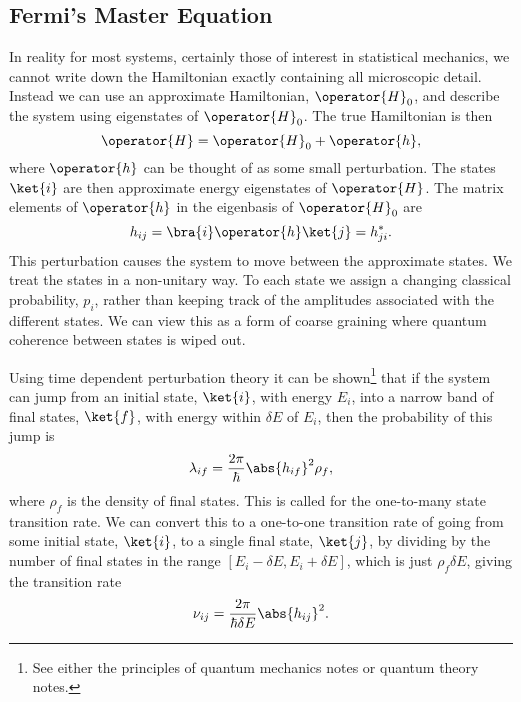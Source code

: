 \documentclass[fleqn]{NotesClass}
\begin{document}
    \subsection{Fermi's Master Equation}
    In reality for most systems, certainly those of interest in statistical mechanics, we cannot write down the Hamiltonian exactly containing all microscopic detail.
    Instead we can use an approximate Hamiltonian, \(\operator{H}_0\), and describe the system using eigenstates of \(\operator{H}_0\).
    The true Hamiltonian is then
    \begin{equation}
        \operator{H} = \operator{H}_0 + \operator{h},
    \end{equation}
    where \(\operator{h}\) can be thought of as some small perturbation.
    The states \(\ket{i}\) are then approximate energy eigenstates of \(\operator{H}\).
    The matrix elements of \(\operator{h}\) in the eigenbasis of \(\operator{H}_0\) are
    \begin{equation}
        h_{ij} = \bra{i}\operator{h}\ket{j} = h_{ji}^*.
    \end{equation}
    This perturbation causes the system to move between the approximate states.
    We treat the states in a non-unitary way.
    To each state we assign a changing classical probability, \(p_i\), rather than keeping track of the amplitudes associated with the different states.
    We can view this as a form of coarse graining where quantum coherence between states is wiped out.
    
    Using time dependent perturbation theory it can be shown\footnote{See either the principles of quantum mechanics notes or quantum theory notes.} that if the system can jump from an initial state, \(\ket{i}\), with energy \(E_i\), into a narrow band of final states, \(\ket{f}\), with energy within \(\delta E\) of \(E_i\), then the probability of this jump is
    \begin{equation}
        \lambda_{if} = \frac{2\pi}{\hbar} \abs{h_{if}}^2\rho_f,
    \end{equation}
    where \(\rho_f\) is the density of final states.
    This is called  for the one-to-many state transition rate.
    We can convert this to a one-to-one transition rate of going from some initial state, \(\ket{i}\), to a single final state, \(\ket{j}\), by dividing by the number of final states in the range \([E_{i} - \delta E, E_i + \delta E]\), which is just \(\rho_f\delta E\), giving the transition rate
    \begin{equation}
        \nu_{ij} = \frac{2\pi}{\hbar \delta E} \abs{h_{ij}}^2.
    \end{equation}
    
\end{document}
